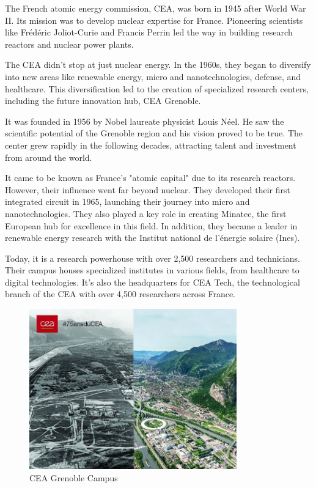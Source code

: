 \medskip

The French atomic energy commission, CEA, was born in 1945 after World War II.  Its mission was to develop nuclear 
expertise for France.  Pioneering scientists like Frédéric Joliot-Curie and Francis Perrin led the way in building 
research reactors and nuclear power plants.

\medskip

The CEA didn't stop at just nuclear energy.  In the 1960s, they began to diversify into new areas like renewable energy,
 micro and nanotechnologies, defense, and healthcare.  This diversification led to the creation of specialized research
  centers, including the future innovation hub, CEA Grenoble.

\medskip

It was founded in 1956 by Nobel laureate physicist Louis Néel.  He saw the scientific potential of the Grenoble
region and his vision proved to be true.  The center grew rapidly in the following decades, attracting talent and investment
from around the world.

\medskip

It came to be known as France's "atomic capital" due to its research reactors.  However, their influence went far beyond
 nuclear.  They developed their first integrated circuit in 1965, launching their journey into micro and nanotechnologies.  
 They also played a key role in creating Minatec, the first European hub for excellence in this field.  In addition, they 
 became a leader in renewable energy research with the Institut national de l'énergie solaire (Ines).

\medskip

Today, it is a research powerhouse with over 2,500 researchers and technicians.  Their campus houses specialized
 institutes in various fields, from healthcare to digital technologies.  It's also the headquarters for CEA Tech, the
  technological branch of the CEA with over 4,500 researchers across France.

\begin{figure}[h!]
    \centering
    \includegraphics[width=0.8\textwidth]{images/old_new.jpg}
    \caption{CEA Grenoble Campus}
\end{figure}

